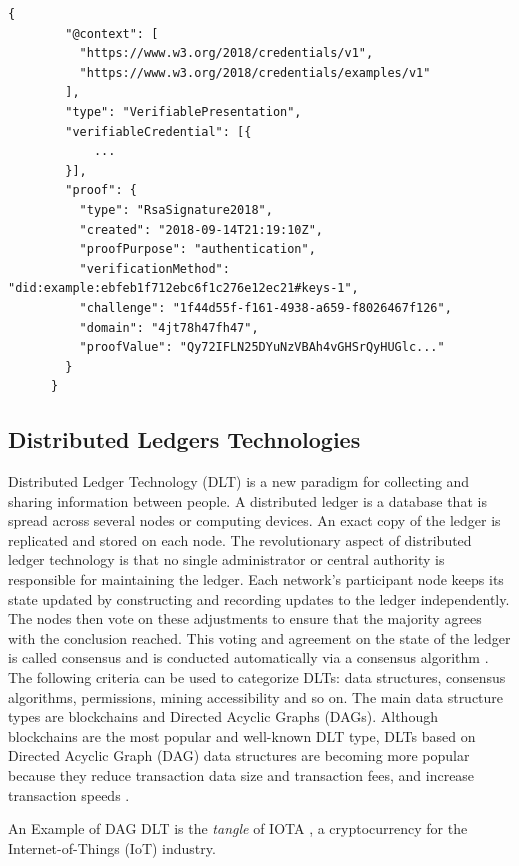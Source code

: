 \begin{lstlisting}[caption={A simple example of a verifiable presentation \cite{vcW3C}.},captionpos=b,style=json, label={vpExample},breaklines=true,frame=single]
    {
        "@context": [
          "https://www.w3.org/2018/credentials/v1",
          "https://www.w3.org/2018/credentials/examples/v1"
        ],
        "type": "VerifiablePresentation",
        "verifiableCredential": [{
            ...
        }],
        "proof": {
          "type": "RsaSignature2018",
          "created": "2018-09-14T21:19:10Z",
          "proofPurpose": "authentication",
          "verificationMethod": "did:example:ebfeb1f712ebc6f1c276e12ec21#keys-1",
          "challenge": "1f44d55f-f161-4938-a659-f8026467f126",
          "domain": "4jt78h47fh47",
          "proofValue": "Qy72IFLN25DYuNzVBAh4vGHSrQyHUGlc..."
        }
      }   
\end{lstlisting}

\subsection{Distributed Ledgers Technologies}

Distributed Ledger Technology (DLT)  is a new paradigm for collecting and sharing information between people. A distributed ledger is a database that is spread across several nodes or computing devices. An exact copy of the ledger is replicated and stored on each node. The revolutionary aspect of distributed ledger technology is that no single administrator or central authority is responsible for maintaining the ledger. Each network's participant node keeps its state updated by constructing and recording updates to the ledger independently. The nodes then vote on these adjustments to ensure that the majority agrees with the conclusion reached. This voting and agreement on the state of the ledger is called consensus and is conducted automatically via a consensus algorithm \cite{dlt-intro-1}. 
The following criteria can be used to categorize DLTs: data structures, consensus algorithms, permissions, mining accessibility and so on. The main data structure types are blockchains and Directed Acyclic Graphs (DAGs). Although blockchains are the most popular and well-known DLT type,  DLTs based on Directed Acyclic Graph (DAG) data structures are becoming more popular because they reduce transaction data size and transaction fees, and increase transaction speeds \cite{dlt-intro-2}.

An Example of DAG DLT is the \textit{tangle} of IOTA \cite{popov2018tangle}, a cryptocurrency for the Internet-of-Things (IoT) industry.

